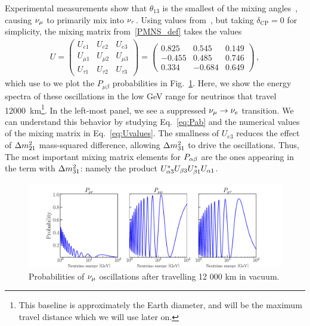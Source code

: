 Experimental measurements show that $\theta_{13}$ is the smallest of the mixing angles~\cite{nufit}, causing 
$\nu_\mu$ to primarily mix into $\nu_\tau$. Using values from~\cite{nufit}, but taking $\delta_\mathrm{CP} = 0$ for simplicity,
the mixing matrix from~\ref{PMNS_def} takes the values
\begin{align}\label{eq:Uvalues}
   U = \begin{pmatrix}
       U_{e 1} & U_{e2} & U_{e3} \\
       U_{\mu 1} & U_{\mu 2} & U_{\mu 3} \\
       U_{\tau 1} & U_{\tau 2} & U_{\tau 3}
   \end{pmatrix} 
   = \begin{pmatrix}
       0.825 & 0.545 & 0.149 \\
       -0.455 & 0.485 & 0.746 \\
       0.334 & -0.684 & 0.649
   \end{pmatrix} \,,
\end{align}
which use to we plot the $P_{\mu \beta}$ probabilities in Fig.~\ref{fig:vac_osc}. Here, we show the energy spectra of these oscillations in the low \si{\GeV} range for neutrinos that travel \SI{12000}{\km}\footnote{This baseline
is approximately the Earth diameter, and will be the maximum travel distance which we will use later on.}.
In the left-most panel, we see a suppressed $\nu_\mu \to \nu_e$ transition. We can understand this behavior by studying Eq.~\ref{eq:Pab} and the 
numerical values of the mixing matrix in Eq.~\ref{eq:Uvalues}.
The smallness of $U_{e3}$ reduces the effect of $\dm[21]$ mass-squared difference,
allowing $\dm[31]$ to drive the oscillations. Thus, 
The most important mixing matrix elements for $P_{\alpha\beta}$ are the ones appearing in the term with $\dm[31]$:
namely the product $U_{\alpha3}^*U_{\beta3} U_{\beta1}^*U_{\alpha1}$.

\begin{figure}[!h]
    \begin{center}
    \includegraphics[width=1\textwidth]{figures/vac_osc.pdf}
    \caption{Probabilities of $\nu_\mu$ oscillations after travelling 12 000 km in vacuum.}\label{fig:vac_osc}
    \end{center}
\end{figure}


